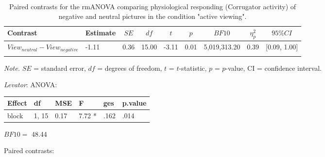 \documentclass[
  man,floatsintext]{apa6}
\begin{document}
\begin{table}[H]

\begin{center}
\begin{threeparttable}

\caption{\label{tab:unnamed-chunk-6}Paired contrasts for the rmANOVA comparing physiological responding (Corrugator activity) of negative and neutral pictures in the condition "active viewing".}

\begin{tabular}{lllllllll}
\toprule
Contrast & \multicolumn{1}{c}{Estimate} & \multicolumn{1}{c}{$SE$} & \multicolumn{1}{c}{$df$} & \multicolumn{1}{c}{$t$} & \multicolumn{1}{c}{$p$} & \multicolumn{1}{c}{$BF10$} & \multicolumn{1}{c}{$\eta_{p}^{2}$} & \multicolumn{1}{c}{$95\% CI$}\\
\midrule
$View_{neutral} - View_{negative}$ & -1.11 & 0.36 & 15.00 & -3.11 & 0.01 & 5,019,313.20 & 0.39 & {}[0.09, 1.00]\\
\bottomrule
\addlinespace
\end{tabular}

\begin{tablenotes}[para]
\normalsize{\textit{Note.} $SE$ = standard error, $df$ = degrees of freedom, $t$ = $t$-statistic, $p$ = $p$-value, CI = confidence interval.}
\end{tablenotes}

\end{threeparttable}
\end{center}

\end{table}

\emph{Levator}: ANOVA:

\begin{tabular}{l|l|l|l|l|l}
\hline
Effect & df & MSE & F & ges & p.value\\
\hline
block & 1, 15 & 0.17 & 7.72 * & .162 & .014\\
\hline
\end{tabular}

\(BF10=\) 48.44

Paired contrasts:
\end{document}
